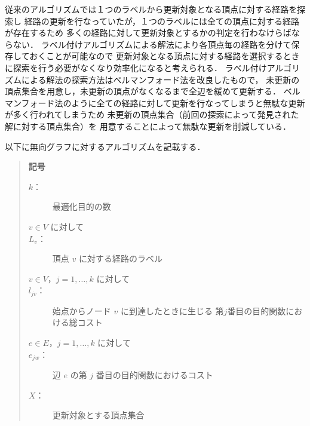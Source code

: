 \documentclass[12pt]{optlab-bachelor}
\begin{document}
従来のアルゴリズムでは１つのラベルから更新対象となる頂点に対する経路を探索し
経路の更新を行なっていたが，１つのラベルには全ての頂点に対する経路が存在するため
多くの経路に対して更新対象とするかの判定を行わなけらばならない．
ラベル付けアルゴリズムによる解法により各頂点毎の経路を分けて保存しておくことが可能なので
更新対象となる頂点に対する経路を選択するときに探索を行う必要がなくなり効率化になると考えられる．
ラベル付けアルゴリズムによる解法の探索方法はベルマンフォード法を改良したもので，
未更新の頂点集合を用意し，未更新の頂点がなくなるまで全辺を緩めて更新する．
ベルマンフォード法のように全ての経路に対して更新を行なってしまうと無駄な更新が多く行われてしまうため
未更新の頂点集合（前回の探索によって発見された解に対する頂点集合）を
用意することによって無駄な更新を削減している．


以下に無向グラフに対するアルゴリズムを記載する．

\begin{quote}
  \textbf{記号}
  \begin{description}
    \item[$k$：] 最適化目的の数
    \item[$v \in V$ に対して]
    \item[$L_v$：] 頂点 $v$ に対する経路のラベル
    \item[$v \in V$，$j = 1 , \ldots , k$ に対して]
    \item[$l_{jv}$：] 始点からノード $v$ に到達したときに生じる
    第$j$番目の目的関数における総コスト
    \item[$e \in E$，$j = 1 , \ldots , k$ に対して]
    \item[$e_{jw}$：] 辺 $e$ の第 $j$ 番目の目的関数におけるコスト
    \item[$X$：] 更新対象とする頂点集合
  \end{description}
\end{quote}
\end{document}

